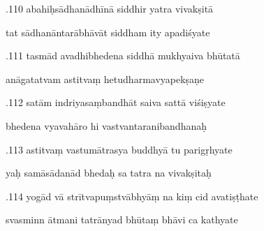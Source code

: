 \documentclass[article,12pt,a4paper]{memoir}%
\newcounter{parCount}
\begin{document}
	  
	  \pstart {}.110 abahiḥsādhanādhīnā siddhir yatra vivakṣitā 
	{}
	\pend%
      

	  
	  \pstart \leavevmode%
	tat sādhanāntarābhāvāt siddham ity apadiśyate 
	{}
	\pend%
      

	  
	  \pstart {}.111 tasmād avadhibhedena siddhā mukhyaiva bhūtatā 
	{}
	\pend%
      

	  
	  \pstart \leavevmode%
	anāgatatvam astitvaṃ hetudharmavyapekṣaṇe 
	{}
	\pend%
      

	  
	  \pstart {}.112 satām indriyasaṃbandhāt saiva sattā viśiṣyate 
	{}
	\pend%
      

	  
	  \pstart \leavevmode%
	bhedena vyavahāro hi vastvantaranibandhanaḥ 
	{}
	\pend%
      

	  
	  \pstart {}.113 astitvaṃ vastumātrasya buddhyā tu parigṛhyate 
	{}
	\pend%
      

	  
	  \pstart \leavevmode%
	yaḥ samāsādanād bhedaḥ sa tatra na vivakṣitaḥ 
	{}
	\pend%
      

	  
	  \pstart {}.114 yogād vā strītvapuṃstvābhyāṃ na kiṃ cid avatiṣṭhate 
	{}
	\pend%
      

	  
	  \pstart \leavevmode%
	svasminn ātmani tatrānyad bhūtaṃ bhāvi ca kathyate 
	{}
	\pend%
      
\end{document}
